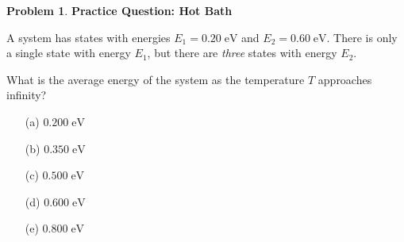 \documentclass[12pt]{article}
\theoremstyle{definition} %
\newtheorem{problem}{Problem}
\theoremstyle{plain} %
\begin{document}
                \begin{problem}
                  \textbf{Practice Question: Hot Bath}
                  
                  A system has states with energies \(E_1 = 0.20\;\text{eV}\) and
                  \(E_2 = 0.60\;\text{eV}\).  There is only a single state with energy
                  \(E_1\), but there are \emph{three} states with energy \(E_2\).
                  
                  \medskip
                  What is the average energy of the system as the temperature \(T\) approaches infinity?
                  
                  \begin{enumerate}
                    \item[(a)] \(0.200\;\text{eV}\)
                    \item[(b)] \(0.350\;\text{eV}\)
                    \item[(c)] \(0.500\;\text{eV}\)
                    \item[(d)] \(0.600\;\text{eV}\)
                    \item[(e)] \(0.800\;\text{eV}\)
                  \end{enumerate}
                \end{problem}
\end{document}
